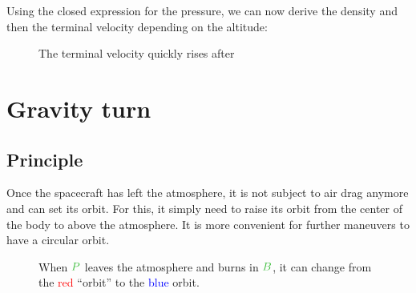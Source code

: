 Using the closed expression for the pressure, we can now derive the
density and then the terminal velocity depending on the altitude:

\begin{figure}[H]
\centering
{}
\caption{The terminal velocity quickly rises after }
\end{figure}



\section{Gravity turn}


\subsection{Principle}

Once the spacecraft has left the atmosphere, it is not subject to air
drag anymore and can set its orbit. For this, it simply need to raise
its orbit from the center of the body to above the atmosphere. It is
more convenient for further maneuvers to have a circular orbit.

\begin{figure}[H]
\centering
{}
\caption{
	When $\posit{P}$ leaves the atmosphere and burns in $\posit{B}$,
	it can change from the \textcolor{red}{red} “orbit” to the
	\textcolor{blue}{blue} orbit.
}
\end{figure}


